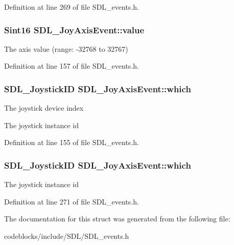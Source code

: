 Definition at line 269 of file S\+D\+L\+\_\+events.\+h.

\hypertarget{structSDL__JoyAxisEvent_a53ee73e7c367934dd6edb69963be5556}{
\subsubsection[{value}]{\setlength{\rightskip}{0pt plus 5cm}Sint16 S\+D\+L\+\_\+\+Joy\+Axis\+Event\+::value}}\label{structSDL__JoyAxisEvent_a53ee73e7c367934dd6edb69963be5556}
The axis value (range\+: -\/32768 to 32767) 

Definition at line 157 of file S\+D\+L\+\_\+events.\+h.

\hypertarget{structSDL__JoyAxisEvent_a965719f4703a7091bcc5f07f79fcf7e1}{
\subsubsection[{which}]{\setlength{\rightskip}{0pt plus 5cm}S\+D\+L\+\_\+\+Joystick\+I\+D S\+D\+L\+\_\+\+Joy\+Axis\+Event\+::which}}\label{structSDL__JoyAxisEvent_a965719f4703a7091bcc5f07f79fcf7e1}
The joystick device index

The joystick instance id 

Definition at line 155 of file S\+D\+L\+\_\+events.\+h.

\hypertarget{structSDL__JoyAxisEvent_a965719f4703a7091bcc5f07f79fcf7e1}{
\subsubsection[{which}]{\setlength{\rightskip}{0pt plus 5cm}S\+D\+L\+\_\+\+Joystick\+I\+D S\+D\+L\+\_\+\+Joy\+Axis\+Event\+::which}}\label{structSDL__JoyAxisEvent_a965719f4703a7091bcc5f07f79fcf7e1}
The joystick instance id 

Definition at line 271 of file S\+D\+L\+\_\+events.\+h.



The documentation for this struct was generated from the following file\+:\begin{DoxyCompactItemize}
\item 
codeblocks/include/\+S\+D\+L/S\+D\+L\+\_\+events.\+h\end{DoxyCompactItemize}
